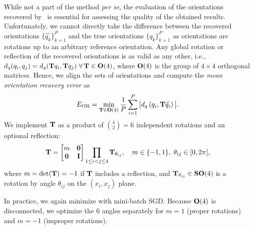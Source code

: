 While not a part of the method \textit{per se}, the evaluation of the orientations recovered by~ is essential for assessing the quality of the obtained results.
Unfortunately, we cannot directly take the difference between the recovered orientations $\{\widehat{q_k}\}_{k=1}^P$ and the true orientations $\{q_k\}_{k=1}^P$ as orientations are rotations up to an arbitrary reference orientation.
Any global rotation or reflection of the recovered orientations is as valid as any other, i.e., $d_q(q_i, q_j) = d_q(\mathbf{T} q_i , \mathbf{T} q_j) \; \forall \, \mathbf{T} \in \mathrm{\mathbf{O}}(4)$, where $\mathrm{\mathbf{O}}(4)$ is the group of $4 \times 4$ orthogonal matrices. %
Hence, we align the sets of orientations and compute the \textit{mean orientation recovery error} as
\begin{equation}
    E_\text{OR} = \min_{\mathbf{T} \in \mathrm{\mathbf{O}}(4)} \frac{1}{P} \sum_{i=1}^P \big| d_q\left( q_i, \mathbf{T} \widehat{q_i} \right) \big|.
    \label{eqn:orientation-recovery-error}
\end{equation}
We implement $\mathbf{T}$ as a product of $\binom{4}{2}=6$ independent rotations and an optional reflection:
\begin{equation*}
    \mathbf{T} =
    \begin{bmatrix}
        m & \mathbf{0} \\
        \mathbf{0} & \mathbf{I} \\
    \end{bmatrix}
    \prod_{1 \leq i < j \leq 4} \mathbf{T}_{\theta_{ij}},
    \quad m \in \{-1,1\}, \; \theta_{ij} \in [0, 2\pi[,
\end{equation*}
where $m = \det(\mathbf{T}) = -1$ if $\mathbf{T}$ includes a reflection, and $\mathbf{T}_{\theta_{ij}} \in \mathrm{\mathbf{SO}}(4)$ is a rotation by angle $\theta_{ij}$ on the $(x_i, x_j)$ plane.


In practice, we again minimize  with mini-batch SGD.
Because $\mathrm{\mathbf{O}}(4)$ is disconnected, we optimize the 6 angles separately for $m = 1$ (proper rotations) and $m = -1$ (improper rotations).
